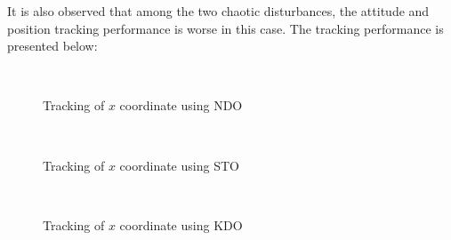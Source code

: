 \documentclass[letterpaper%
, twoside%
, 12pt%
,memoire%
, english%
,creativecommons,hyperref%
]{thETS}
\begin{document}
It is also observed that among the two chaotic disturbances, the attitude and position tracking performance is worse in this case. The tracking performance is presented below: 

\begin{figure}[H]
\centering
{}
\\ \parbox{0.75\textwidth}{\caption{Tracking of $x$ coordinate using NDO}\label{x_trac_dis_m1_ndo}}
\end{figure}

\begin{figure}[H]
\centering
{}
\\ \parbox{0.75\textwidth}{\caption{Tracking of $x$ coordinate using STO}\label{x_trac_dis_m1_sto}}
\end{figure}

\begin{figure}[H]
\centering
{}
\\ \parbox{0.75\textwidth}{\caption{Tracking of $x$ coordinate using KDO}\label{x_trac_dis_m1_kdo}}
\end{figure}
\end{document}
